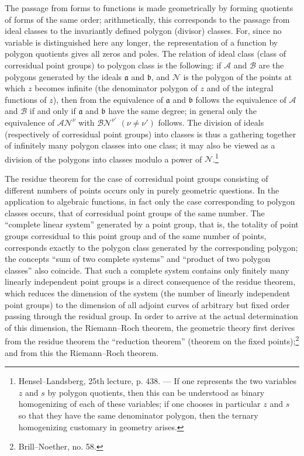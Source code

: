 \documentclass[11pt]{article}
\providecommand{\fra}{\mathfrak a}
\providecommand{\frb}{\mathfrak b}
\providecommand{\calA}{\mathcal A}
\providecommand{\calB}{\mathcal B}
\providecommand{\calN}{\mathcal N}
\begin{document}
The passage from forms to functions is made geometrically by forming quotients of forms of the same order; arithmetically, this corresponds to the passage from ideal classes to the invariantly defined polygon (divisor) classes. For, since no variable is distinguished here any longer, the representation of a function by polygon quotients gives all zeros and poles. The relation of ideal class (class of corresidual point groups) to polygon class is the following: if \(\calA\) and \(\calB\) are the polygons generated by the ideals \(\fra\) and \(\frb\), and \(\calN\) is the polygon of the points at which \(z\) becomes infinite (the denominator polygon of \(z\) and of the integral functions of \(z\)), then from the equivalence of \(\fra\) and \(\frb\) follows the equivalence of \(\calA\) and \(\calB\) if and only if \(\fra\) and \(\frb\) have the same degree; in general only the equivalence of \(\calA\calN^\nu\) with \(\calB\calN^{\nu'}\) \((\nu\ne\nu')\) follows. The division of ideals (respectively of corresidual point groups) into classes is thus a gathering together of infinitely many polygon classes into one class; it may also be viewed as a division of the polygons into classes modulo a power of \(\calN\).\footnote{Hensel--Landsberg, 25th lecture, p. 438. --- If one represents the two variables \(z\) and \(s\) by polygon quotients, then this can be understood as binary homogenizing of each of these variables; if one chooses in particular \(z\) and \(s\) so that they have the same denominator polygon, then the ternary homogenizing customary in geometry arises.}

The residue theorem for the case of corresidual point groups consisting of different numbers of points occurs only in purely geometric questions. In the application to algebraic functions, in fact only the case corresponding to polygon classes occurs, that of corresidual point groups of the same number. The ``complete linear system'' generated by a point group, that is, the totality of point groups corresidual to this point group and of the same number of points, corresponds exactly to the polygon class generated by the corresponding polygon; the concepts ``sum of two complete systems'' and ``product of two polygon classes'' also coincide. That such a complete system contains only finitely many linearly independent point groups is a direct consequence of the residue theorem, which reduces the dimension of the system (the number of linearly independent point groups) to the dimension of all adjoint curves of arbitrary but fixed order passing through the residual group. In order to arrive at the actual determination of this dimension, the Riemann--Roch theorem, the geometric theory first derives from the residue theorem the ``reduction theorem'' (theorem on the fixed points);\footnote{Brill--Noether, no. 58.} and from this the Riemann--Roch theorem.
\end{document}
